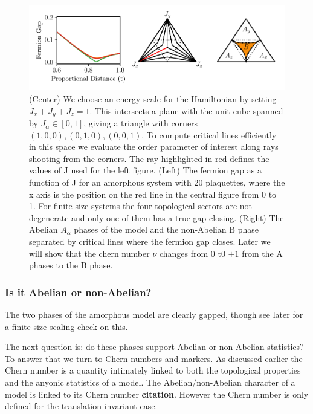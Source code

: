 \begin{figure}
\hypertarget{fig:phase_diagram}{%
\centering
\includegraphics[width=1\textwidth,height=\textheight]{figure_code/amk_chapter/results/phase_diagram/phase_diagram.pdf}
\caption{(Center) We choose an energy scale for the Hamiltonian by
setting \(J_x + J_y + J_z = 1\). This intersects a plane with the unit
cube spanned by \(J_\alpha \in [0,1]\), giving a triangle with corners
\((1,0,0), (0,1,0), (0,0,1)\). To compute critical lines efficiently in
this space we evaluate the order parameter of interest along rays
shooting from the corners. The ray highlighted in red defines the values
of J used for the left figure. (Left) The fermion gap as a function of J
for an amorphous system with 20 plaquettes, where the x axis is the
position on the red line in the central figure from 0 to 1. For finite
size systems the four topological sectors are not degenerate and only
one of them has a true gap closing. (Right) The Abelian \(A_\alpha\)
phases of the model and the non-Abelian B phase separated by critical
lines where the fermion gap closes. Later we will show that the chern
number \(\nu\) changes from \(0\) t0 \(\pm 1\) from the A phases to the
B phase.}\label{fig:phase_diagram}
}
\end{figure}

\hypertarget{is-it-abelian-or-non-abelian}{%
\subsubsection{Is it Abelian or
non-Abelian?}\label{is-it-abelian-or-non-abelian}}

The two phases of the amorphous model are clearly gapped, though see
later for a finite size scaling check on this.

The next question is: do these phases support Abelian or non-Abelian
statistics? To answer that we turn to Chern numbers and markers. As
discussed earlier the Chern number is a quantity intimately linked to
both the topological properties and the anyonic statistics of a model.
The Abelian/non-Abelian character of a model is linked to its Chern
number \textbf{citation}. However the Chern number is only defined for
the translation invariant case.

